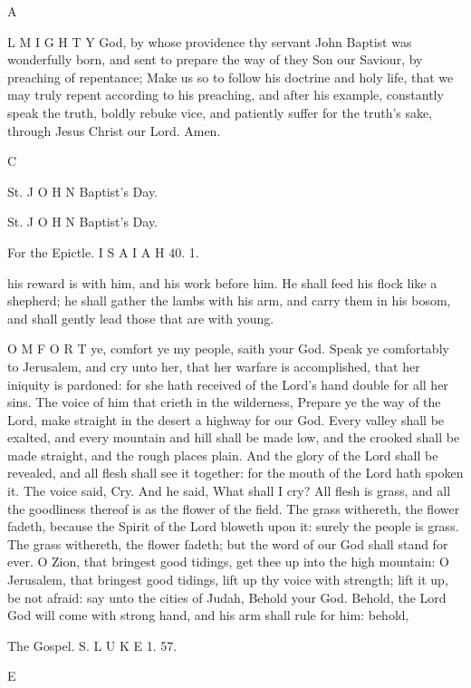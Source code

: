 A

L M I G H T Y God, by whose providence thy servant John Baptist was wonderfully born, and sent to prepare the way of they Son our Saviour, by preaching of repentance; Make us so to follow his doctrine and holy life, that we may truly repent according to his preaching, and after his example, constantly speak the truth, boldly rebuke vice, and patiently suffer for the truth’s sake, through Jesus Christ our Lord. Amen.

C

St. J O H N Baptist’s Day.

St. J O H N Baptist’s Day.

For the Epictle. I S A I A H 40. 1.

his reward is with him, and his work before him. He shall feed his flock like a shepherd; he shall gather the lambs with his arm, and carry them in his bosom, and shall gently lead those that are with young.

O M F O R T ye, comfort ye my people, saith your God. Speak ye comfortably to Jerusalem, and cry unto her, that her warfare is accomplished, that her iniquity is pardoned: for she hath received of the Lord’s hand double for all her sins. The voice of him that crieth in the wilderness, Prepare ye the way of the Lord, make straight in the desert a highway for our God. Every valley shall be exalted, and every mountain and hill shall be made low, and the crooked shall be made straight, and the rough places plain. And the glory of the Lord shall be revealed, and all flesh shall see it together: for the mouth of the Lord hath spoken it. The voice said, Cry. And he said, What shall I cry? All flesh is grass, and all the goodliness thereof is as the flower of the field. The grass withereth, the flower fadeth, because the Spirit of the Lord bloweth upon it: surely the people is grass. The grass withereth, the flower fadeth; but the word of our God shall stand for ever. O Zion, that bringest good tidings, get thee up into the high mountain: O Jerusalem, that bringest good tidings, lift up thy voice with strength; lift it up, be not afraid: say unto the cities of Judah, Behold your God. Behold, the Lord God will come with strong hand, and his arm shall rule for him: behold,

The Gospel. S. L U K E 1. 57.

E

